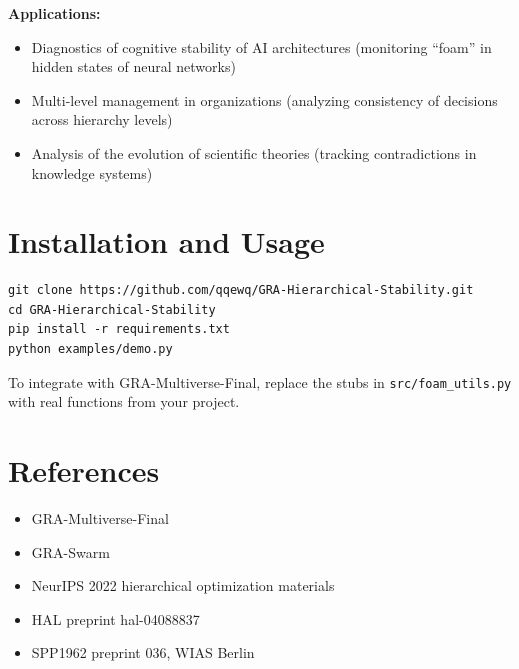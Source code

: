 \documentclass[11pt,a4paper]{article}
\begin{document}
\textbf{Applications:}
\begin{itemize}
    \item Diagnostics of cognitive stability of AI architectures (monitoring ``foam'' in hidden states of neural networks)
    \item Multi-level management in organizations (analyzing consistency of decisions across hierarchy levels)
    \item Analysis of the evolution of scientific theories (tracking contradictions in knowledge systems)
\end{itemize}

\section{Installation and Usage}

\begin{verbatim}
git clone https://github.com/qqewq/GRA-Hierarchical-Stability.git
cd GRA-Hierarchical-Stability
pip install -r requirements.txt
python examples/demo.py
\end{verbatim}

To integrate with GRA-Multiverse-Final, replace the stubs in \texttt{src/foam\_utils.py} with real functions from your project.

\section{References}

\begin{itemize}
    \item GRA-Multiverse-Final
    \item GRA-Swarm
    \item NeurIPS 2022 hierarchical optimization materials
    \item HAL preprint hal-04088837
    \item SPP1962 preprint 036, WIAS Berlin
\end{itemize}
\end{document}
